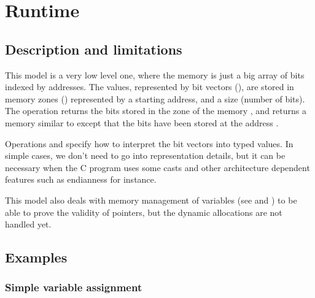 
\section{Runtime}\label{sec-runtime}

\subsection{Description and limitations}

This model is a very low level one, where the memory is just a big array of bits
indexed by addresses. The values, represented by bit vectors 
(),
are stored in memory zones ()
represented by a starting address, and a size (number of bits).
The   operation returns the bits stored in the zone
of the memory , and  returns a memory similar to
 except that the bits  have been stored at the address
.

Operations  and  specify
how to interpret the bit vectors into typed values.
In simple cases, we don't need to go into representation details,
but it can be necessary when the C program uses some casts
and other architecture dependent features
such as endianness for instance.

This model also deals with memory management of variables 
(see  and )
to be able to prove the validity of pointers,
but the dynamic allocations are not handled yet.

\subsection{Examples}

\subsubsection{Simple variable assignment}

